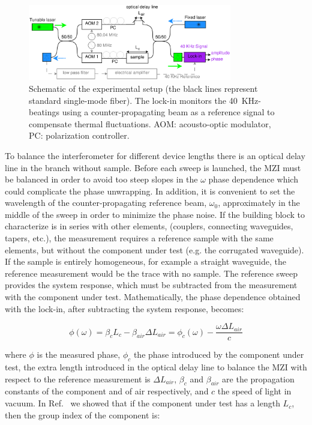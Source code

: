 \documentclass[journal]{IEEEtran}
\begin{document}
\begin{figure}[htb]
	\centering
	\includegraphics[width=3.5in]{dispersion6}
	\caption{Schematic of the experimental setup (the black lines represent standard single-mode fiber).
	The lock-in monitors the 40~KHz-beatings using a counter-propagating beam as a reference signal to compensate thermal fluctuations.
	AOM: acousto-optic modulator, PC: polarization controller. }
	\label{fig:dispersionSetup}
\end{figure}

To balance the interferometer for different device lengths there is an optical delay line in the branch without sample.
Before each sweep is launched, the MZI must be balanced in order to avoid too steep slopes in the $\omega$ phase dependence which could complicate the phase unwrapping.
In addition, it is convenient to set the wavelength of the counter-propagating reference beam, $\omega_0$, approximately in the middle of the sweep in order to minimize the phase noise.
If the building block to characterize is in series with other elements, (couplers, connecting waveguides, tapers, etc.), the measurement requires a reference sample with the same elements, but without the component under test (e.g. the corrugated waveguide). If the sample is entirely homogeneous, for example a straight waveguide, the reference measurement would be the trace with no sample.
The reference sweep provides the system response, which must be subtracted from the measurement with the component under test. 
Mathematically, the phase dependence obtained with the lock-in, after subtracting the system response, becomes:


\begin{equation}
  \phi(\omega)= \beta_c L_c - \beta_{air} \Delta L_{air} =\phi_{c}(\omega)-\frac{\omega\Delta L_{air}}{c}
  \label{eq:response}
\end{equation}

where $\phi$ is the measured phase, $\phi_{c}$ the phase introduced by the component under test, the extra length introduced in the optical delay line to balance the MZI with respect to the reference measurement is $\Delta L_{air}$, $\beta_c$ and $\beta_{air}$ are the propagation constants of the component and of air respectively, and $c$ the speed of light in vacuum.
In Ref.~\cite{Mas2012} we showed that if the component under test has a length $L_{c}$, then the group index of the component is:
\end{document}
